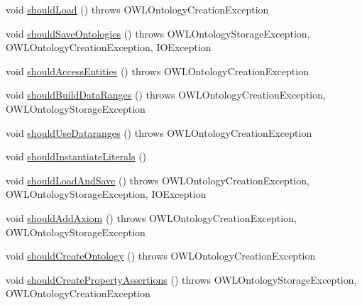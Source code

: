 \begin{DoxyCompactItemize}
\item 
void \hyperlink{classorg_1_1coode_1_1owlapi_1_1examples_1_1_examples_a90f88f1fa8563f9571c4bfd58e1c2ba7}{should\-Load} ()  throws O\-W\-L\-Ontology\-Creation\-Exception 
\item 
void \hyperlink{classorg_1_1coode_1_1owlapi_1_1examples_1_1_examples_a961ecfc2b6922e208d5011ee35556e85}{should\-Save\-Ontologies} ()  throws O\-W\-L\-Ontology\-Storage\-Exception,             O\-W\-L\-Ontology\-Creation\-Exception, I\-O\-Exception 
\item 
void \hyperlink{classorg_1_1coode_1_1owlapi_1_1examples_1_1_examples_a092d02624d84106971843c899574c70d}{should\-Access\-Entities} ()  throws O\-W\-L\-Ontology\-Creation\-Exception 
\item 
void \hyperlink{classorg_1_1coode_1_1owlapi_1_1examples_1_1_examples_ae83de81b4815d1073f714b46b78d18c9}{should\-Build\-Data\-Ranges} ()  throws O\-W\-L\-Ontology\-Creation\-Exception,             O\-W\-L\-Ontology\-Storage\-Exception 
\item 
void \hyperlink{classorg_1_1coode_1_1owlapi_1_1examples_1_1_examples_a4582c17919fedbc3b813e7e7a149c355}{should\-Use\-Dataranges} ()  throws O\-W\-L\-Ontology\-Creation\-Exception 
\item 
void \hyperlink{classorg_1_1coode_1_1owlapi_1_1examples_1_1_examples_acb926018035dc5a59b58c3c4f601f813}{should\-Instantiate\-Literals} ()
\item 
void \hyperlink{classorg_1_1coode_1_1owlapi_1_1examples_1_1_examples_a21367410c4f65ea789061d0a9e35be37}{should\-Load\-And\-Save} ()  throws O\-W\-L\-Ontology\-Creation\-Exception,             O\-W\-L\-Ontology\-Storage\-Exception, I\-O\-Exception 
\item 
void \hyperlink{classorg_1_1coode_1_1owlapi_1_1examples_1_1_examples_ab1602eb11d275460507f693b4904b053}{should\-Add\-Axiom} ()  throws O\-W\-L\-Ontology\-Creation\-Exception,             O\-W\-L\-Ontology\-Storage\-Exception 
\item 
void \hyperlink{classorg_1_1coode_1_1owlapi_1_1examples_1_1_examples_a8f318863fff0c6a6b85f09d1953989fa}{should\-Create\-Ontology} ()  throws O\-W\-L\-Ontology\-Creation\-Exception 
\item 
void \hyperlink{classorg_1_1coode_1_1owlapi_1_1examples_1_1_examples_a45eb6843eb6a3578c7ebc0be2c8b1a29}{should\-Create\-Property\-Assertions} ()  throws O\-W\-L\-Ontology\-Storage\-Exception,             O\-W\-L\-Ontology\-Creation\-Exception 
\item 

\end{DoxyCompactItemize}
